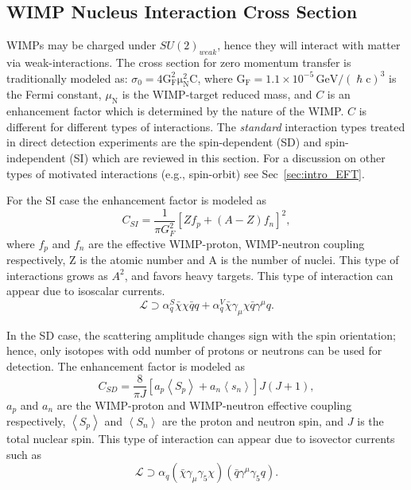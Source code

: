 \subsection{WIMP Nucleus Interaction Cross Section}
\label{subsubsec:WIMP_CS}

WIMPs may be charged under $SU(2)_{weak}$, hence they will interact with matter via weak-interactions. The cross section for zero momentum transfer is traditionally modeled as: $\sigma_0 = \mathrm{4G^2_F\mu_N^2C}$, where $\mathrm{G_F = 1.1\times 10^{-5}\,GeV/(\hslash c)^3}$ is the Fermi constant, $\mu_\mathrm{N}$ is the WIMP-target reduced mass, and $C$ is an enhancement factor which is determined by the nature of the WIMP. $C$ is different for different types of interactions. The \textit{standard} interaction types treated in direct detection experiments are the spin-dependent (SD) and spin-independent (SI) which are reviewed in this section. For a discussion on other types of motivated interactions (e.g., spin-orbit) see Sec~\ref{sec:intro_EFT}.

For the SI case the enhancement factor is modeled as
\begin{equation}
C_{SI} = \frac{1}{\pi G_F^2}[Zf_p + (A-Z)f_n]^2,
\end{equation} 
where $f_p$ and $f_n$ are the effective WIMP-proton, WIMP-neutron coupling respectively, Z is the atomic number and A is the number of nuclei. This type of interactions grows as $A^2$, and favors heavy targets. This type of interaction can appear due to isoscalar currents.
\begin{equation}
\mathcal{L} \supset \alpha_q^S \bar{\chi} \chi \bar{q}q + \alpha_q^V\bar{\chi}\gamma_\mu\chi\bar{q}\gamma^\mu q.  
\end{equation}

In the SD case, the scattering amplitude changes sign with the spin orientation; hence, only isotopes with odd number of protons  or neutrons can be used for detection. The enhancement factor is modeled as
\begin{equation}
C_{SD} = \frac{8}{\pi J}[a_p\left<S_p\right> + a_n\left<s_n\right>]J(J+1),
\end{equation}  
$a_p$ and $a_n$ are the WIMP-proton and WIMP-neutron effective coupling respectively, $\left<S_p\right>$ and  $\left<S_n\right>$ are the proton and neutron spin, and $J$ is the total nuclear spin. This type of interaction can appear due to isovector currents such as
\begin{equation}
\mathcal{L} \supset \alpha_q(\bar{\chi}\gamma_\mu\gamma_5\chi)(\bar{q}\gamma^\mu\gamma_5q).
\end{equation}
